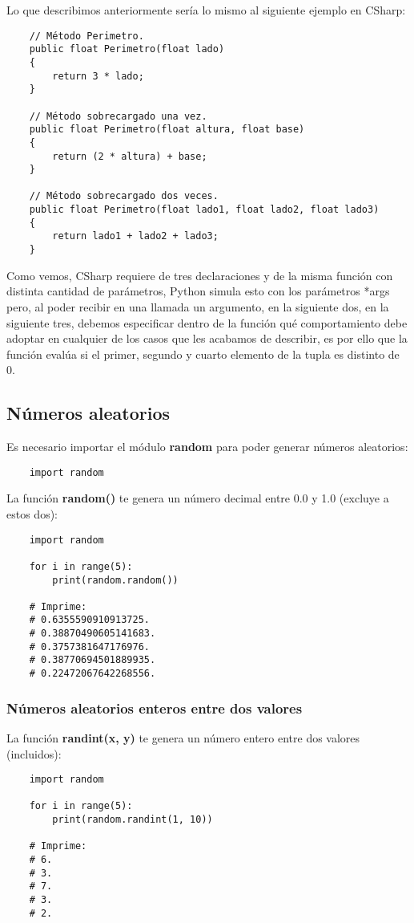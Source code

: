 Lo que describimos anteriormente sería lo mismo al siguiente ejemplo en CSharp:
\begin{lstlisting}
    // Método Perimetro.
    public float Perimetro(float lado)
    {
        return 3 * lado;
    }

    // Método sobrecargado una vez.
    public float Perimetro(float altura, float base)
    {
        return (2 * altura) + base;
    }

    // Método sobrecargado dos veces.
    public float Perimetro(float lado1, float lado2, float lado3)
    {
        return lado1 + lado2 + lado3;
    }
\end{lstlisting}

Como vemos, CSharp requiere de tres declaraciones y de la misma función con distinta cantidad de parámetros, Python simula esto con los parámetros *args pero, al poder recibir en una llamada un argumento, en la siguiente dos, en la siguiente tres, debemos especificar dentro de la función qué comportamiento debe adoptar en cualquier de los casos que les acabamos de describir, es por ello que la función evalúa si el primer, segundo y cuarto elemento de la tupla es distinto de 0.


\subsection{Números aleatorios}

Es necesario importar el módulo \textbf{random} para poder generar números aleatorios:
\begin{lstlisting}
    import random
\end{lstlisting}

La función \textbf{random()} te genera un número decimal entre 0.0 y 1.0 (excluye a estos dos):
\begin{lstlisting}
    import random

    for i in range(5):
        print(random.random())

    # Imprime:
    # 0.6355590910913725.
    # 0.38870490605141683.
    # 0.3757381647176976.
    # 0.38770694501889935.
    # 0.22472067642268556.
\end{lstlisting}


\subsubsection{Números aleatorios enteros entre dos valores}

La función \textbf{randint(x, y)} te genera un número entero entre dos valores (incluidos):
\begin{lstlisting}
    import random

    for i in range(5):
        print(random.randint(1, 10))

    # Imprime:
    # 6.
    # 3.
    # 7.
    # 3.
    # 2.
\end{lstlisting}


